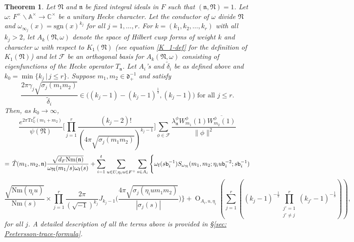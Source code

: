 \documentclass[reqno]{amsart}
\theoremstyle{plain}
\newtheorem{theorem}{Theorem}
\theoremstyle{definition}
\theoremstyle{remark}
\def\Nr{\mathrm{Nm}}
\def\b{\mathtt b}
\def\tr{\mathrm{Tr}}
\def\O{\operatorname{O}}
\begin{document}
\begin{theorem}\label{Main theorem}
Let $\mathfrak{N}$ and $\mathfrak{n}$ be fixed integral ideals in $F$ such that $( \mathfrak{n}, \mathfrak{N}) = 1$.  Let $\omega:\,F^{\times} \backslash \mathbb A^{\times} \to \mathbb C^{\times}$ be a unitary Hecke character. Let the conductor of $\omega$ divide $\mathfrak{N}$ and $\omega_{\infty_j}(x)=\mathrm{sgn} (x)^{k_j} $ for all $j=1,\dots, r$.   For $k = (k_1,k_2,\dots, k_r)$ with all $k_j >2$, let $A_k(\mathfrak{N},\omega)$ denote the space of Hilbert cusp forms of weight $k$ and character $\omega$ with respect to $K_1(\mathfrak{N})$ (see equation \eqref{K_1-def} for the definition of $K_1(\mathfrak{N})$) and let $\mathcal{F}$ be an orthogonal basis for $A_{k}(\mathfrak{N},\omega)$ consisting of eigenfunctions of the Hecke operator $T_{\mathfrak{n}}$.  Let $A_i$'s and $\tilde{\delta}_i$  be as defined above and $k_0=\min \{ k_j \,  | \, j\leq r\}$. Suppose $m_1,m_2 \in \mathfrak{d}^{-1}_+$  and  satisfy
\begin{equation}\label{m1jm2j}
\frac{2\pi \gamma_j\sqrt{\sigma_{j}(m_1m_2)}}{\tilde{\delta}_i}\in \Big((k_{j}  -1)-(k_{j}  -1)^{\frac{1}{3}},(k_{j}  -1)\Big) \text{ for all }j \leq r.
\end{equation}
Then,  as $k_0\rightarrow  \infty$,
$$ 
\frac{e^{2\pi \tr_{\mathbb{Q}}^F (m_1+m_2)}}{{\psi(\mathfrak{N})}}
 \Bigg[\prod_{j=1}^r  \frac{(k_j-2)!}{(4\pi \sqrt{\sigma_j(m_1m_2)})^{k_j-1}} \Bigg]
\sum_{{\phi} \in \mathcal{F} }\frac{\lambda_\mathfrak{n}^\phi W_{m_1}^\phi(1) \overline{W_{m_2}^\phi(1)}}{\|\phi \|^2}
 $$
$$=\, \Hat{T}(m_1,m_2,\mathfrak{n})\frac{\sqrt{d_F\Nr(\mathfrak{n})}}{\omega_\mathfrak{N}(m_1/s)\omega_{\mathrm{f}}(s)}
+ \sum_{i=1}^t \sum_{u\in U, \eta_i u\in F^+}\sum_{s\in A_i }\Bigg\{ \omega_{\mathrm{f}}(s\b_i^{-1} ) S_{\omega_\mathfrak{N}} (m_1,m_2;\eta_i u \b_i^{-2};s\b_i^{-1})
 $$$$ 
\frac{\sqrt{\Nr(\eta_i u)}}{\Nr(s)}\times  \prod_{j=1}^r\frac{2\pi}{(\sqrt{-1})^{k_j}}J_{k_j-1} \Big(  \frac{4 \pi\sqrt{\sigma_j (\eta_i u m_1m_2 )}}{|\sigma_j(s)|}\Big)
 \Bigg\}+\O_{A_i,u,\eta_i} \left(\sum_{j=1}^r \left( (k_{j}-1)^{-\frac{1}{2}}\prod_{\substack{j'=1\\ j'\neq j}}^r(k_{j'}-1)^{-\frac{1}{3}}\right)\right),$$
for all $j$. 
 A detailed description of all the terms above is provided in \S\ref{sec: Peetersson-trace-formula}.
\end{theorem}
\end{document}
